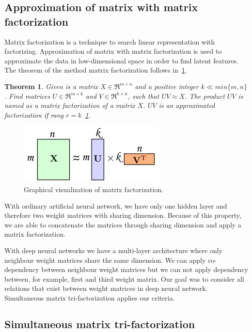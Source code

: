 \documentclass{article} %
\newtheorem{theorem}{Theorem}[section]
\begin{document}
\subsection{Approximation of matrix with matrix factorization}

Matrix factorization is a technique to search linear representation with
factorizing. Approximation of matrix with matrix factorization is used to
approximate the data in low-dimensional space in order to find latent features.
The theorem of the method matrix factorization follows in~\ref{t:1}.

\begin{theorem}\label{t:1}
Given is a matrix $X \in \Re^{m \times n}$ and a positive integer $k \ll 
min\{m,n\}$. Find matrices $U \in \Re^{m \times k}$ and $V \in \Re^{k \times 
n}$, such that $UV \approx X$. The product $UV$ is named as a matrix 
factorization of a matrix $X$. $UV$ is an approximated factorization if 
rang $r = k$~\ref{f:mf1}.
\end{theorem}
\begin{figure}[!ht]
\centering 
\includegraphics[width=.4\textwidth]{mf1.png}
\caption{Graphical visualization of matrix factorization.}
\label{f:mf1}
\end{figure}

With ordinary artificial neural network, we have only one hidden layer and
therefore two weight matrices with sharing dimension. Because of this property,
we are able to concatenate the matrices through sharing dimension and apply a
matrix factorization.

With deep neural networks we have a multi-layer architecture where only
neighbour weight matrices share the same dimension. We can apply co-dependency
between neighbour weight matrices but we can not apply dependency between, for
example, first and third weight matrix. Our goal was to consider all relations
that exist between weight matrices in deep neural network. Simultaneous matrix
tri-factorization applies our criteria.


\subsection{Simultaneous matrix tri-factorization}
\end{document}
